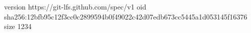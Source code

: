 version https://git-lfs.github.com/spec/v1
oid sha256:12bfb95c12f3cc0c2899594b0f49022c42d07edb673cc5445a1d053145f16376
size 1234
